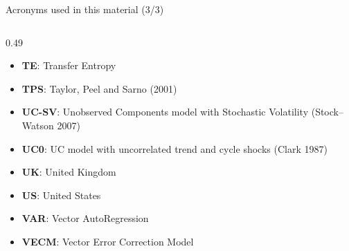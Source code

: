 \begin{frame}{Acronyms used in this material (3/3)}
\begin{columns}[T]
\begin{column}{0.49\textwidth}
\begin{itemize}
    \item \textbf{TE}: Transfer Entropy
    \item \textbf{TPS}: Taylor, Peel and Sarno (2001)
    \item \textbf{UC-SV}: Unobserved Components model with Stochastic Volatility (Stock–Watson 2007)
    \item \textbf{UC0}: UC model with uncorrelated trend and cycle shocks (Clark 1987)
    \item \textbf{UK}: United Kingdom
    \item \textbf{US}: United States
    \item \textbf{VAR}: Vector AutoRegression
    \item \textbf{VECM}: Vector Error Correction Model
\end{itemize}
\end{column}
\end{columns}
\end{frame}

